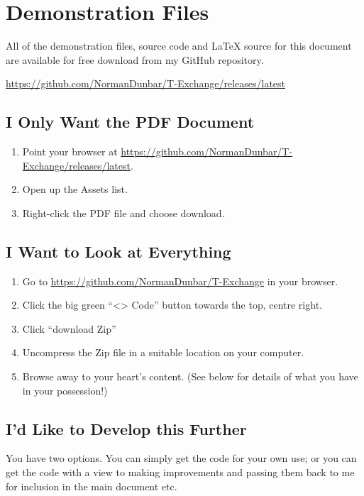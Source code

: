 \chapter{Demonstration Files}

All of the demonstration files, source code and \LaTeX{} source for this document are available for free download from my GitHub repository.

\url{https://github.com/NormanDunbar/T-Exchange/releases/latest}

\section{I Only Want the PDF Document}

\begin{enumerate}
    \item Point your browser at \url{https://github.com/NormanDunbar/T-Exchange/releases/latest}.
    \item Open up the Assets list.
    \item Right-click the PDF file and choose download.
\end{enumerate}


\section{I Want to Look at Everything}

\begin{enumerate}
    \item Go to \url{https://github.com/NormanDunbar/T-Exchange} in your browser.
    \item Click the big green ``<> Code'' button towards the top, centre right.
    \item Click ``download Zip''
    \item Uncompress the Zip file in a suitable location on your computer.
    \item Browse away to your heart's content. (See below for details of what you have in your possession!)
\end{enumerate}

\section{I'd Like to Develop this Further}

You have two options. You can simply get the code for your own use; or you can get the code with a view to making improvements and passing them back to me for inclusion in the main document etc.

